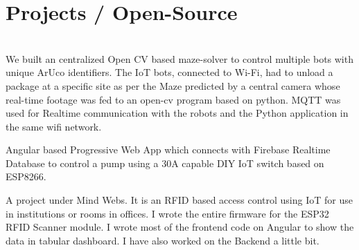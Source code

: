 \documentclass[]{deedy-resume-openfont}
\begin{document}
\section{Projects / Open-Source}
\raggedright
  

\hfill {}\\
We built an centralized Open CV based maze-solver to control multiple bots with unique ArUco identifiers. The IoT bots, connected to Wi-Fi, had to unload a package at a specific site as per the Maze predicted by a central camera whose real-time footage was fed to an open-cv program based on python. MQTT was used for Realtime communication with the robots and the Python application in the same wifi network.\\
\sectionsep


Angular based Progressive Web App which connects with Firebase Realtime Database to control a pump using a 30A capable DIY IoT switch based on ESP8266.\\
\sectionsep


A project under Mind Webs. It is an RFID based access control using IoT for use in institutions or rooms in offices.
I wrote the entire firmware for the ESP32 RFID Scanner module. I wrote most of the frontend code on Angular to show the data in tabular dashboard. I have also worked on the Backend a little bit.\\
\sectionsep

\ 
\end{document}
